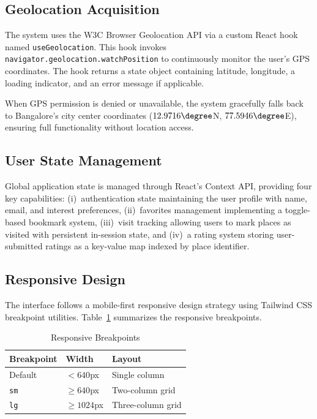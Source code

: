 \documentclass[conference]{IEEEtran}
\begin{document}
\subsection{Geolocation Acquisition}

The system uses the W3C Browser Geolocation API via a custom React hook named \texttt{useGeolocation}. This hook invokes \texttt{navigator.geolocation.watchPosition} to continuously monitor the user's GPS coordinates. The hook returns a state object containing latitude, longitude, a loading indicator, and an error message if applicable.

When GPS permission is denied or unavailable, the system gracefully falls back to Bangalore's city center coordinates ($12.9716\degree$N, $77.5946\degree$E), ensuring full functionality without location access.

\subsection{User State Management}

Global application state is managed through React's Context API, providing four key capabilities: (i)~authentication state maintaining the user profile with name, email, and interest preferences, (ii)~favorites management implementing a toggle-based bookmark system, (iii)~visit tracking allowing users to mark places as visited with persistent in-session state, and (iv)~a rating system storing user-submitted ratings as a key-value map indexed by place identifier.

\subsection{Responsive Design}

The interface follows a mobile-first responsive design strategy using Tailwind CSS breakpoint utilities. Table~\ref{tab:breakpoints} summarizes the responsive breakpoints.

\begin{table}[htbp]
\caption{Responsive Breakpoints}
\label{tab:breakpoints}
\centering
\begin{tabular}{lll}
\toprule
\textbf{Breakpoint} & \textbf{Width} & \textbf{Layout} \\
\midrule
Default & $<640$px & Single column \\
\texttt{sm} & $\geq640$px & Two-column grid \\
\texttt{lg} & $\geq1024$px & Three-column grid \\
\bottomrule
\end{tabular}
\end{table}
\end{document}
